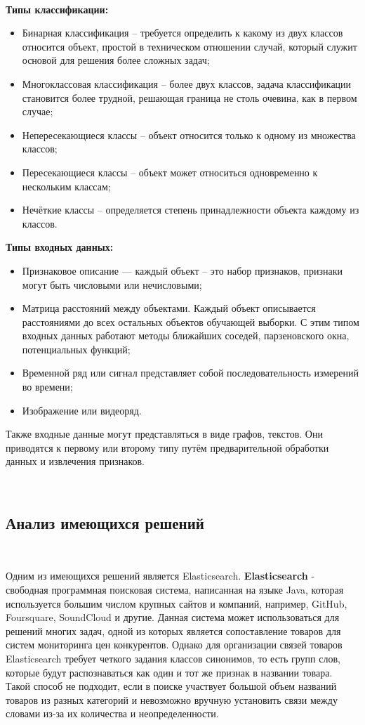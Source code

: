 \

\textbf{Типы классификации:}
\begin{itemize}
  \item Бинарная классификация – требуется определить к какому из двух классов относится объект, простой в техническом отношении случай, который служит основой для решения более сложных задач;
  \item Многоклассовая классификация – более двух классов, задача классификации становится более трудной, решающая граница не столь очевина, как в первом случае;
  \item Непересекающиеся классы – объект относится только к одному из множества классов;
  \item Пересекающиеся классы – объект может относиться одновременно к нескольким классам;
  \item Нечёткие классы – определяется степень принадлежности объекта каждому из классов.
\end{itemize}

\textbf{Типы входных данных:}
\begin{itemize}
  \item Признаковое описание — каждый объект – это набор признаков, признаки могут быть числовыми или нечисловыми;
  \item Матрица расстояний между объектами. Каждый объект описывается расстояниями до всех остальных объектов обучающей выборки. С этим типом входных данных работают методы ближайших соседей, парзеновского окна, потенциальных функций;
  \item Временной ряд или сигнал представляет собой последовательность измерений во времени;
  \item Изображение или видеоряд.
\end{itemize}

Также входные данные могут представляться в виде графов, текстов. Они приводятся к первому или второму типу путём предварительной обработки данных и извлечения признаков.

\

\subsection{Анализ имеющихся решений}
\

Одним из имеющихся решений является Elasticsearch. \textbf{Elasticsearch} - свободная программная поисковая система, написанная на языке Java, которая используется большим числом крупных сайтов и компаний, например, GitHub, Foursquare, SoundCloud и другие. Данная система может использоваться для решений многих задач, одной из которых является сопоставление товаров для систем мониторинга цен конкурентов.\cite{ELASTIC} Однако для организации связей товаров Elasticsearch требует четкого задания классов синонимов, то есть групп слов, которые будут распознаваться как один и тот же признак в названии товара. Такой способ не подходит, если в поиске участвует большой объем названий товаров из разных категорий и невозможно вручную установить связи между словами из-за их количества и неопределенности.

